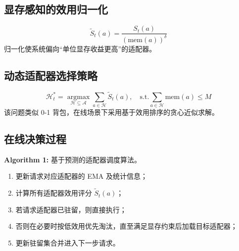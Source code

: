 \subsection{显存感知的效用归一化}
\begin{equation}
\tilde{S}_t(a)=\frac{S_t(a)}{(\mathrm{mem}(a))^\delta}
\end{equation}
归一化使系统偏向“单位显存收益更高”的适配器。

\subsection{动态适配器选择策略}
\begin{equation}
\mathcal{H}_t^*=\underset{\mathcal{H}\subseteq\mathcal{A}}{\operatorname{argmax}}\sum_{a\in\mathcal{H}}\tilde{S}_t(a),\quad \text{s.t.}\sum_{a\in\mathcal{H}}\mathrm{mem}(a)\le M
\end{equation}
该问题类似 0-1 背包，在线场景下采用基于效用排序的贪心近似求解。

\subsection{在线决策过程}
\textbf{Algorithm 1:} 基于预测的适配器调度算法。
\begin{enumerate}
  \item 更新请求对应适配器的 EMA 及统计信息；
  \item 计算所有适配器效用评分 $\tilde{S}_t(a)$；
  \item 若请求适配器已驻留，则直接执行；
  \item 否则在必要时按低效用优先淘汰，直至满足显存约束后加载目标适配器；
  \item 更新驻留集合并进入下一步请求。
\end{enumerate}
